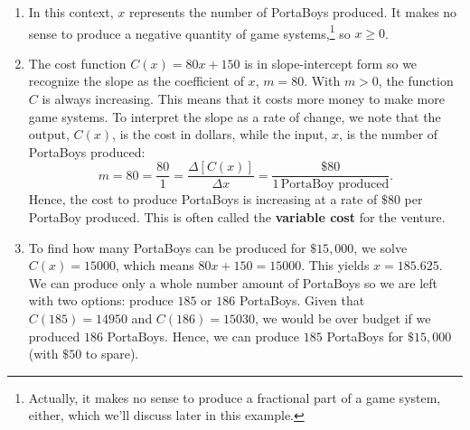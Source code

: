 \documentclass{ximera}
\begin{document}
\begin{example}
\begin{enumerate}
\begin{center}


\end{center}

\item   In this context, $x$ represents the number of PortaBoys produced.  It makes no sense to produce a negative quantity of game systems,\footnote{Actually, it makes no sense to produce a fractional part of a game system, either, which we'll discuss later in this example.}  so $x \geq 0$.


\item  The cost function $C(x)= 80x + 150$ is in slope-intercept form so we recognize the slope as the coefficient of $x$, $m = 80$.  With $m > 0$, the function $C$ is always increasing.  This means that it costs more money to make more game systems.  To interpret the slope as a rate of change, we note that the output, $C(x)$, is the cost in dollars, while the input, $x$,  is the number of PortaBoys produced:  \[ m = 80 = \frac{80}{1} =  \frac{\Delta [C(x)]}{\Delta x} = \frac{\$ 80}{1 \, \mbox{PortaBoy produced}}.\]  Hence, the cost to produce PortaBoys is increasing at a rate of $\$80$ per PortaBoy produced.  This is often called the \textbf{variable cost} for the venture. 


\item  To find how many PortaBoys can be produced for $\$15, \! 000$, we solve $C(x) = 15000$, which means $80x+150 = 15000$.  This yields  $x = 185.625$.  We can produce only a whole number amount of PortaBoys so we are left with two options: produce $185$ or $186$ PortaBoys.  Given that $C(185) =  14950$ and $C(186) = 15030$, we would be over budget if we produced $186$ PortaBoys.  Hence, we can produce $185$ PortaBoys for $\$15, \! 000$ (with $\$50$ to spare). 

\end{enumerate}

\end{example}
\end{document}
